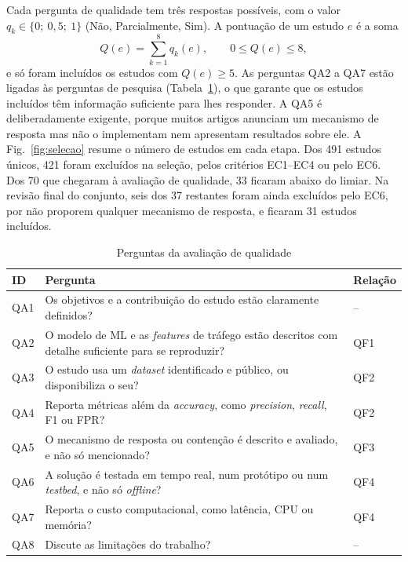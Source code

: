 \documentclass[conference,a4paper]{IEEEtran}
\begin{document}
Cada pergunta de qualidade tem três respostas possíveis, com o valor
$q_k \in \{0;\ 0{,}5;\ 1\}$ (Não, Parcialmente, Sim). A pontuação de um estudo $e$ é a soma
\begin{equation}
  Q(e) = \sum_{k=1}^{8} q_k(e), \qquad 0 \le Q(e) \le 8,
  \label{eq:qualidade}
\end{equation}
e só foram incluídos os estudos com $Q(e) \ge 5$. As perguntas QA2 a QA7 estão ligadas às
perguntas de pesquisa (Tabela~\ref{tab:qualidade}), o que garante que os estudos
incluídos têm informação suficiente para lhes responder. A QA5 é deliberadamente exigente,
porque muitos artigos anunciam um mecanismo de resposta mas não o implementam nem
apresentam resultados sobre ele. A Fig.~\ref{fig:selecao} resume o número de estudos em
cada etapa. Dos 491 estudos únicos, 421 foram excluídos na seleção, pelos critérios
EC1--EC4 ou pelo EC6. Dos 70 que chegaram à avaliação de qualidade, 33 ficaram abaixo do
limiar. Na revisão final do conjunto, seis dos 37 restantes foram ainda excluídos pelo
EC6, por não proporem qualquer mecanismo de resposta, e ficaram 31 estudos incluídos.

\begin{table}[H]
\caption{Perguntas da avaliação de qualidade}\label{tab:qualidade}
\centering\footnotesize
\begin{tabular}{@{}p{}p{}p{}@{}}
\toprule
ID & Pergunta & Relação \\
\midrule
QA1 & Os objetivos e a contribuição do estudo estão claramente definidos? & -- \\
QA2 & O modelo de ML e as \textit{features} de tráfego estão descritos com detalhe suficiente para se reproduzir? & QF1 \\
QA3 & O estudo usa um \textit{dataset} identificado e público, ou disponibiliza o seu? & QF2 \\
QA4 & Reporta métricas além da \textit{accuracy}, como \textit{precision}, \textit{recall}, F1 ou FPR? & QF2 \\
QA5 & O mecanismo de resposta ou contenção é descrito e avaliado, e não só mencionado? & QF3 \\
QA6 & A solução é testada em tempo real, num protótipo ou num \textit{testbed}, e não só \textit{offline}? & QF4 \\
QA7 & Reporta o custo computacional, como latência, CPU ou memória? & QF4 \\
QA8 & Discute as limitações do trabalho? & -- \\
\bottomrule
\end{tabular}
\end{table}
\end{document}
